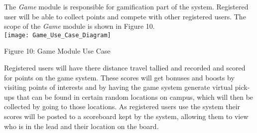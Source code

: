 The \textit{Game} module is responsible for gamification part of the system. Registered user will be able to collect points and compete with other registered users. The scope of the \textit{Game} module is shown in Figure 10.  \\[1cm]

\texttt{[image: Game\_Use\_Case\_Diagram]}
\begin{center}
	Figure 10: Game Module Use Case
\end{center}
{
	Registered users will have there distance travel tallied and recorded and scored for points on the game system. These scores will get bonuses and boosts by visiting points of interests and by having the game system generate virtual pick-ups that can be found in certain random locations on campus, which will then be collected by going to those locations. As registered users use the system their scores will be posted to a scoreboard kept by the system, allowing them to view who is in the lead and their location on the board.
}
		
		
	
	
		
